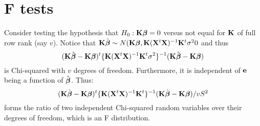 \section{F tests}
\label{sec:ftest}
Consider testing the hypothesis that $H_0:\bK \bbeta = 0$ versus not equal for $\bK$
of full row rank (say $v$). 
Notice that $\bK \hat \bbeta \sim N(\bK \bbeta, \bK \xtxinv \bK^t \sigma^20$ and thus
$$
(\bK \hat \bbeta - \bK \bbeta)^t  \{\bK \xtxinv \bK^t \sigma^2 \}^{-1} (\bK \hat \bbeta - \bK \bbeta)
$$
is Chi-squared with $v$ degrees of freedom. Furthermore, it is independent of
$\be$ being a function of $\hat \bbeta$. Thus:
$$
(\bK \hat \bbeta - \bK \bbeta)^t  \{\bK \xtxinv \bK^t\}^{-1} (\bK \hat \bbeta - \bK \bbeta) / v S^2
$$
forms the ratio of two independent Chi-squared random variables over their degrees of freedom, which is an F distribution. 




